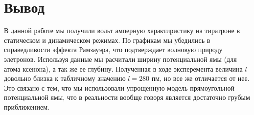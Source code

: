     

    \section*{Вывод}

    В данной работе мы получили вольт амперную характиристику на тиратроне в статическом и динамическом режимах.
    По графикам мы убедились в справедливости эффекта Рамзауэра, что подтверждает волновую природу элетронов. Используя 
    данные мы расчитали ширину потенциальной ямы (для атома ксенона), а так же ее глубину. Полученная в ходе эксперемента
    величина $l$ довольно близка к табличному значению $l = 280$ пм, но все же отличается от нее. Это связано с тем, что
    мы использовали упрощенную модель прямоугольной потенциальной ямы, что в реальности вообще говоря является достаточно грубым
    приближением.

